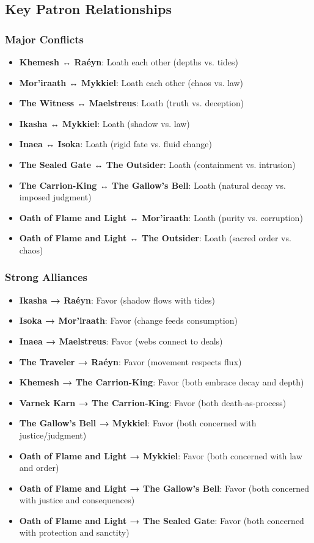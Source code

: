 \documentclass[12pt,twoside]{book}
\begin{document}
\subsection{Key Patron Relationships}

\subsubsection{Major Conflicts}
\begin{itemize}
\item \textbf{Khemesh ↔ Raéyn}: Loath each other (depths vs. tides)
\item \textbf{Mor'iraath ↔ Mykkiel}: Loath each other (chaos vs. law)
\item \textbf{The Witness ↔ Maelstreus}: Loath (truth vs. deception)
\item \textbf{Ikasha ↔ Mykkiel}: Loath (shadow vs. law)
\item \textbf{Inaea ↔ Isoka}: Loath (rigid fate vs. fluid change)
\item \textbf{The Sealed Gate ↔ The Outsider}: Loath (containment vs. intrusion)
\item \textbf{The Carrion-King ↔ The Gallow's Bell}: Loath (natural decay vs. imposed judgment)
\item \textbf{Oath of Flame and Light ↔ Mor'iraath}: Loath (purity vs. corruption)
\item \textbf{Oath of Flame and Light ↔ The Outsider}: Loath (sacred order vs. chaos)
\end{itemize}

\subsubsection{Strong Alliances}
\begin{itemize}
\item \textbf{Ikasha → Raéyn}: Favor (shadow flows with tides)
\item \textbf{Isoka → Mor'iraath}: Favor (change feeds consumption)
\item \textbf{Inaea → Maelstreus}: Favor (webs connect to deals)
\item \textbf{The Traveler → Raéyn}: Favor (movement respects flux)
\item \textbf{Khemesh → The Carrion-King}: Favor (both embrace decay and depth)
\item \textbf{Varnek Karn → The Carrion-King}: Favor (both death-as-process)
\item \textbf{The Gallow's Bell → Mykkiel}: Favor (both concerned with justice/judgment)
\item \textbf{Oath of Flame and Light → Mykkiel}: Favor (both concerned with law and order)
\item \textbf{Oath of Flame and Light → The Gallow's Bell}: Favor (both concerned with justice and consequences)
\item \textbf{Oath of Flame and Light → The Sealed Gate}: Favor (both concerned with protection and sanctity)
\end{itemize}
\end{document}
